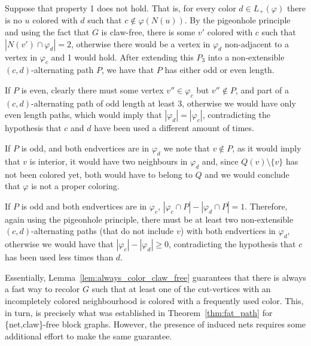 \begin{tproof}
    Suppose that property 1 does not hold.
    That is, for every color $d \in L_+(\varphi)$ there is no $u$ colored with $d$ such that $c \notin \varphi(N(u))$.
    By the pigeonhole principle and using the fact that $G$ is claw-free, there is some $v'$ colored with $c$ such that $\left|N(v') \cap \varphi_d\right| = 2$, otherwise there would be a vertex in $\varphi_d$ non-adjacent to a vertex in $\varphi_c$ and 1 would hold.
    After extending this $P_3$ into a non-extensible $(c,d)$-alternating path $P$, we have that $P$ has either odd or even length.
    
    If $P$ is even, clearly there must some vertex $v'' \in \varphi_c$ but $v'' \notin P$, and part of a $(c,d)$-alternating path of odd length at least 3, otherwise we would have only even length paths, which would imply that $|\varphi_d| = |\varphi_c|$, contradicting the hypothesis that $c$ and $d$ have been used a different amount of times.
    
    If $P$ is odd, and both endvertices are in $\varphi_d$ we note that $v \notin P$, as it would imply that $v$ is interior, it would have two neighbours in $\varphi_d$ and, since $Q(v) \setminus \{v\}$ has not been colored yet, both would have to belong to $Q$ and we would conclude that $\varphi$ is not a proper coloring.
    
    If $P$ is odd and both endvertices are in $\varphi_c$, $|\varphi_c \cap P| - |\varphi_d \cap P|  = 1$.
    Therefore, again using the pigeonhole principle, there must be at least two non-extensible $(c,d)$-alternating paths (that do not include $v$) with both endvertices in $\varphi_d$, otherwise we would have that $|\varphi_c| - |\varphi_d| \geq 0$, contradicting the hypothesis that $c$ has been used less times than $d$.
\end{tproof}

Essentially, Lemma~\ref{lem:always_color_claw_free} guarantees that there is always a fast way to recolor $G$ such that at least one of the cut-vertices with an incompletely colored neighbourhood is colored with a frequently used color.
This, in turn, is precisely what was established in Theorem~\ref{thm:fat_path} for \{net,claw\}-free block graphs. However, the presence of induced nets requires some additional effort to make the same guarantee.

